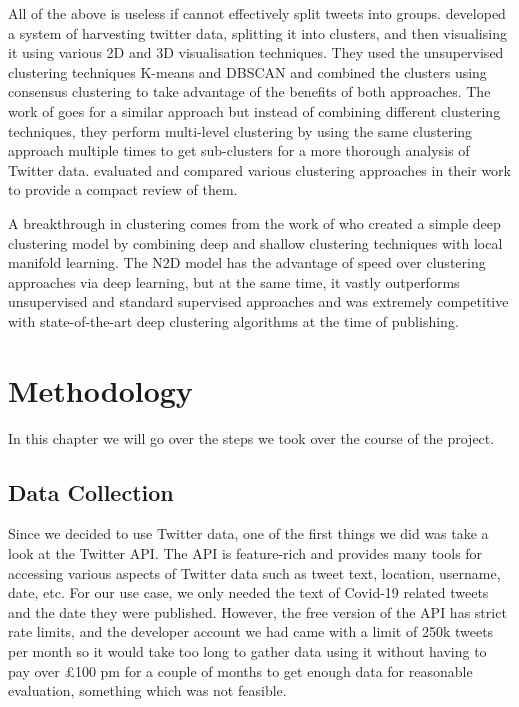 \documentclass{l4proj}
\begin{document}
All of the above is useless if cannot effectively split tweets into groups. \cite{Sechelea2016TwitterDC} developed a system of harvesting twitter data, splitting it into clusters, and then visualising it using various 2D and 3D visualisation techniques. They used the unsupervised clustering techniques K-means and DBSCAN and combined the clusters using consensus clustering to take advantage of the benefits of both approaches. The work of \cite{Baralis2013AnalysisOT} goes for a similar approach but instead of combining different clustering techniques, they perform multi-level clustering by using the same clustering approach multiple times to get sub-clusters for a more thorough analysis of Twitter data. \cite{Alnajran2017ClusterAO} evaluated and compared various clustering approaches in their work to provide a compact review of them.

A breakthrough in clustering comes from the work of \cite{McConville2020} who created a simple deep clustering model by combining deep and shallow clustering techniques with local manifold learning. The N2D model has the advantage of speed over clustering approaches via deep learning, but at the same time, it vastly outperforms unsupervised and standard supervised approaches and was extremely competitive with state-of-the-art deep clustering algorithms at the time of publishing.




\chapter{Methodology}
In this chapter we will go over the steps we took over the course of the project.

\section{Data Collection}
Since we decided to use Twitter data, one of the first things we did was take a look at the Twitter API. The API is feature-rich and provides many tools for accessing various aspects of Twitter data such as tweet text, location, username, date, etc. For our use case, we only needed the text of Covid-19 related tweets and the date they were published. However, the free version of the API has strict rate limits, and the developer account we had came with a limit of 250k tweets per month so it would take too long to gather data using it without having to pay over \pounds100 pm for a couple of months to get enough data for reasonable evaluation, something which was not feasible.
\end{document}
